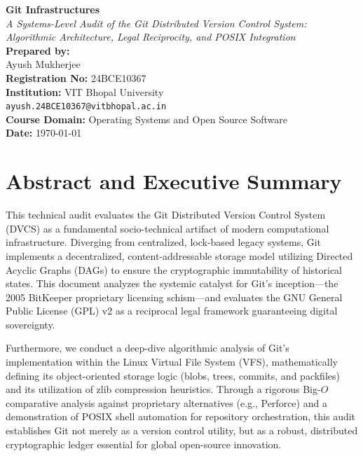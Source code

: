 \documentclass[11pt, a4paper]{article}
\begin{document}
\begin{titlepage}
    \centering
    \vspace*{3cm}
    \Huge \textbf{Git Infrastructures} \\
    \vspace{0.7cm}
    \Large \textit{A Systems-Level Audit of the Git Distributed Version Control System: \\ Algorithmic Architecture, Legal Reciprocity, and POSIX Integration} \\
    \vfill
    \large
    \textbf{Prepared by:} \\
    Ayush Mukherjee \\
    \textbf{Registration No:} 24BCE10367 \\
    \textbf{Institution:} VIT Bhopal University \\
    \texttt{ayush.24BCE10367@vitbhopal.ac.in} \\
    \vspace{1cm}
    \textbf{Course Domain:} Operating Systems and Open Source Software \\
    \vfill
    \textbf{Date:} \today
\end{titlepage}

\newpage
\section*{Abstract and Executive Summary}
This technical audit evaluates the Git Distributed Version Control System (DVCS) as a fundamental socio-technical artifact of modern computational infrastructure. Diverging from centralized, lock-based legacy systems, Git implements a decentralized, content-addressable storage model utilizing Directed Acyclic Graphs (DAGs) to ensure the cryptographic immutability of historical states. This document analyzes the systemic catalyst for Git's inception—the 2005 BitKeeper proprietary licensing schism—and evaluates the GNU General Public License (GPL) v2 as a reciprocal legal framework guaranteeing digital sovereignty. 

Furthermore, we conduct a deep-dive algorithmic analysis of Git's implementation within the Linux Virtual File System (VFS), mathematically defining its object-oriented storage logic (blobs, trees, commits, and packfiles) and its utilization of zlib compression heuristics. Through a rigorous Big-$O$ comparative analysis against proprietary alternatives (e.g., Perforce) and a demonstration of POSIX shell automation for repository orchestration, this audit establishes Git not merely as a version control utility, but as a robust, distributed cryptographic ledger essential for global open-source innovation.

\newpage
\tableofcontents
\newpage





\newpage

\end{document}
